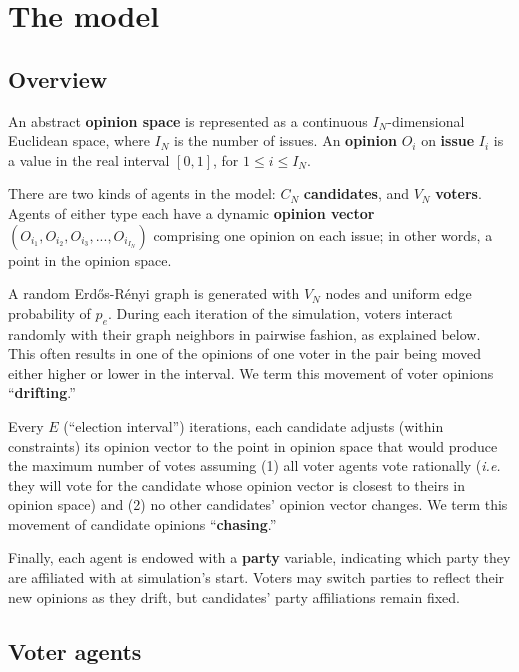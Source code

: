 \section{The model}
\label{sec:model}

\subsection{Overview}

An abstract \textbf{opinion space} is represented as a continuous
$I_N$-dimensional Euclidean space, where $I_N$ is the number of issues. An
\textbf{opinion} $O_i$ on \textbf{issue} $I_i$ is a value in the real interval
$[0,1]$, for $1 \leq i \leq I_N$.

There are two kinds of agents in the model: $C_N$ \textbf{candidates}, and
$V_N$ \textbf{voters}. Agents of either type each have a dynamic
\textbf{opinion vector} $(O_{i_1}, O_{i_2}, O_{i_3}, ..., O_{i_{I_N}})$
comprising one opinion on each issue; in other words, a point in the opinion
space.

A random Erd\H{o}s-R\'{e}nyi graph\cite{erdos_evolution_1960} is generated
with $V_N$ nodes and uniform edge probability of $p_e$. During each iteration
of the simulation, voters interact randomly with their graph neighbors in
pairwise fashion, as explained below. This often results in one of the opinions
of one voter in the pair being moved either higher or lower in the interval.
We term this movement of voter opinions ``\textbf{drifting}.''

Every $E$ (``election interval'') iterations, each candidate adjusts (within
constraints) its opinion vector to the point in opinion space that would
produce the maximum number of votes assuming (1) all voter agents vote
rationally (\textit{i.e.} they will vote for the candidate whose opinion vector
is closest to theirs in opinion space) and (2) no other candidates' opinion
vector changes. We term this movement of candidate opinions
``\textbf{chasing}.''

Finally, each agent is endowed with a \textbf{party} variable, indicating which
party they are affiliated with at simulation's start. Voters may switch parties 
to reflect their new opinions as they drift, but candidates' party affiliations
remain fixed.

\subsection{Voter agents}

